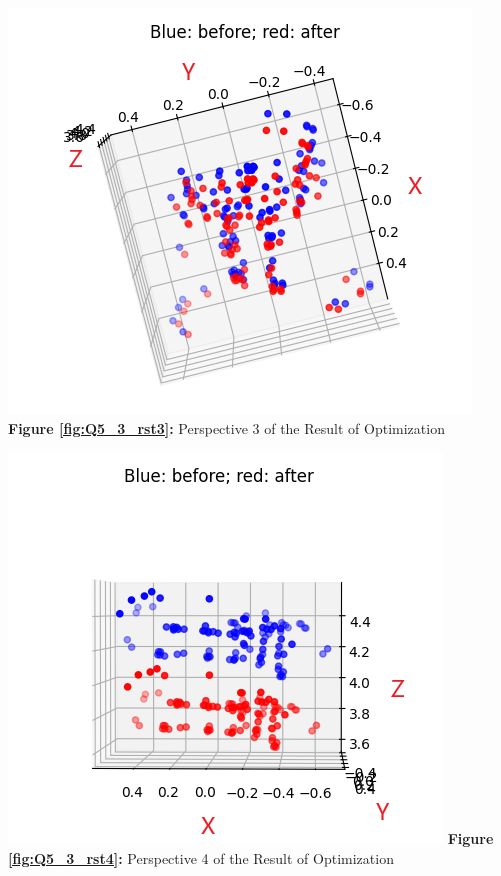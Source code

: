 \begin{your_solution}[title=Q5.3,height=21.5cm,width=\linewidth]
\begin{minipage}{0.5\linewidth}
	\centering
	\includegraphics[width=1\linewidth, height=1\columnwidth]{../Q5_3_rst3.png}
	\textbf{Figure \ref{fig:Q5_3_rst3}:} Perspective 3 of the Result of Optimization
	\label{fig:Q5_3_rst3}         %
\end{minipage}
\hfill
\begin{minipage}{0.5\linewidth}
	\centering
	\includegraphics[width=1\linewidth, height=1\columnwidth]{../Q5_3_rst4.png}
	\textbf{Figure \ref{fig:Q5_3_rst4}:} Perspective 4 of the Result of Optimization
	\label{fig:Q5_3_rst4}         %
\end{minipage}
	

\end{your_solution}
